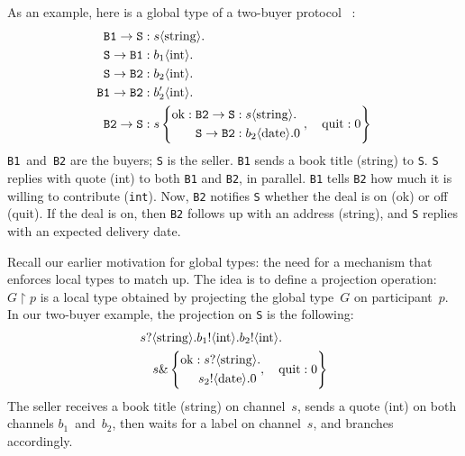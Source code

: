 \documentclass[a4paper,12pt,oneside,fleqn]{book} %
\begin{document}
As an example, here is a global type of a two-buyer protocol~%
  \cite{DBLP:journals/jacm/HondaYC16}:
\begin{align}
\begin{aligned}
  {\tt B1}\to{\tt S} &: s\langle{\rm string}\rangle. \\
  {\tt S}\to{\tt B1} &: b_1\langle{\rm int}\rangle. \\
  {\tt S}\to{\tt B2} &: b_2\langle{\rm int}\rangle. \\
  {\tt B1}\to{\tt B2} &: b'_2\langle{\rm int}\rangle. \\
  {\tt B2}\to{\tt S} &: s
    \left\{
      \begin{aligned}
      {\rm ok} :
        {\tt B2}\to{\tt S} &: s\langle{\rm string}\rangle. \\
        {\tt S}\to{\tt B2} &: b_2\langle{\rm date}\rangle. 0 \\
      \end{aligned}
      \;,\quad
      \begin{aligned}
      {\rm quit} : 0
      \end{aligned}
    \right\}
\end{aligned}
\end{align}
{\tt B1}~and~{\tt B2} are the buyers; {\tt S} is the seller.
{\tt B1} sends a book title ({\rm string}) to {\tt S}.
{\tt S} replies with quote ({\rm int}) to both {\tt B1} and {\tt B2}, in parallel.
{\tt B1} tells {\tt B2} how much it is willing to contribute ({\tt int}).
Now, {\tt B2} notifies {\tt S}
  whether the deal is on ({\rm ok})
  or off ({\rm quit}).
If the deal is on,
  then {\tt B2} follows up with an address ({\rm string}),
  and {\tt S} replies with an expected delivery date.

Recall our earlier motivation for global types:
  the need for a mechanism that enforces local types to match up.
The idea is to define a projection operation:
  $G \upharpoonright p$ is a local type obtained by projecting
    the global type~$G$ on participant~$p$.
In our two-buyer example,
  the projection on {\tt S} is the following:
\begin{align}
\begin{aligned}
&s? \langle{\rm string}\rangle.
b_1! \langle{\rm int}\rangle.
b_2! \langle{\rm int}\rangle. \\
&\quad s \&
\left\{
  \begin{aligned}
  {\rm ok} : s&?\langle{\rm string}\rangle. \\
    s_2&!\langle{\rm date}\rangle.0
  \end{aligned}
  ,
  \quad{\rm quit}:0
\right\}
\end{aligned}
\end{align}
The seller receives a book title ({\rm string}) on channel~$s$,
  sends a quote ({\rm int}) on both channels $b_1$~and~$b_2$,
  then waits for a label on channel~$s$,
  and branches accordingly.
\end{document}
